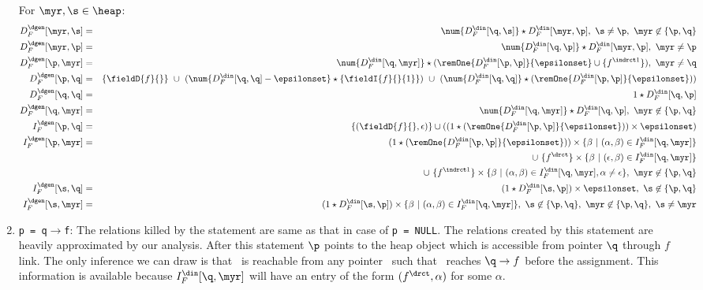\begin{enumerate}
For $\myr, \s \in \heap$:
\begin{eqnarray*}
  D_F^{\dgen}[\myr, \s] &=& \num{D_F^{\din}[\q, \s]} \star
  D_F^{\din}[\myr, \p],\ \s \not= \p,\ \myr \not\in
  \{\p, \q\}\\ 
  D_F^{\dgen}[\myr, \p] &=& \num{D_F^{\din}[\q,\p]} \star
  D_F^{\din}[\myr, \p], \ \myr \not= \p\\
 D_F^{\dgen}[\p, \myr] &=& \num{D_F^{\din}[\q, \myr]} \star
 (\remOne{D_F^{\din}[\p, \p]}{\epsilonset} \cup \{f^{\indrct
   1}\}),\ \myr \not= \q \\ 
  D_F^{\dgen}[\p, \q] &=&
  \{\fieldD{f}{}\}\ \cup\ (\num{D_F^{\din}[\q, \q] -
    \epsilonset} \star
  \{\fieldI{f}{}{1}\})\ \cup\  (\num{D_F^{\din}[\q, \q]}
  \star ( \remOne{D_F^{\din}[\p, \p]}{\epsilonset})) \\ 
  D_F^{\dgen}[\q, \q] &=& 1 \star D_F^{\din}[\q, \p] \\
  D_F^{\dgen}[\q, \myr] &=& \num{D_F^{\din}[\q, \myr]} \star
  D_F^{\din}[\q, \p],\ \myr \not\in \{\p,
  \q\} \\ 
  I_F^{\dgen}[\p, \q] &=& \{(\fieldD{f}{}, \epsilon)\}
  \cup ((1 \star (\remOne{D_F^{\din}[\p,
      \p]}{\epsilonset})) \times \epsilonset) \\	 
  I_F^{\dgen}[\p, \myr] &=& 
  (1 \star (\remOne{D_F^{\din}[\p, \p]}{\epsilonset})) \times
  \{\beta\ \vert\ (\alpha, \beta) \in I_F^{\din}[\q, \myr] \}
  \\
  && \cup\ \{f^\drct\} \times 
  \{\beta\ \vert\ (\epsilon, \beta) \in I_F^{\din}[\q, \myr] \}
  \\
  && \cup\ \{f^{\indrct 1}\} \times 
  \{\beta\ \vert\ (\alpha, \beta) \in I_F^{\din}[\q, \myr],
  \alpha \not= \epsilon \},\ \myr \not\in \{\p, \q\} \\
  I_F^{\dgen}[\s, \q] &=& (1 \star D_F^{\din}[\s, \p]) \times
  \epsilonset,\ \s \not\in \{\p, \q\} \\ 
  I_F^{\dgen}[\s, \myr] &=& (1 \star D_F^{\din}[\s, \p])
  \times \{\beta\ \vert\ (\alpha, \beta) \in I_F^{\din}[\q,
    \myr]\},\ \s \not\in \{\p, \q\},\ \myr \not\in \{\p,
  \q\},\ \s \not= \myr 
\end{eqnarray*}

\item {\tt p = q$\rightarrow$f}: The relations killed by the
  statement are same as that in case of {\tt p = NULL}. The
  relations created by this statement are heavily
  approximated by our analysis.  After this statement $\p$
  points to the heap object which is accessible from pointer
  $\q$ through $f$ link. The only inference we can draw is
  that \p\ is reachable from any pointer \myr\ such that
  \myr\ reaches $\q\rightarrow f$ before the assignment. This
  information is available because $I_F^{\din}[\q, \myr]$
  will have an entry of the form $(f^\drct, \alpha)$ for some
  $\alpha$. 


\end{enumerate}
